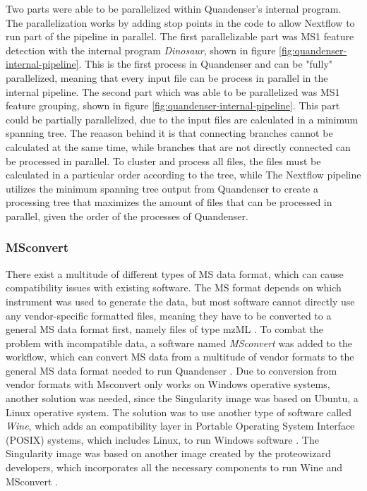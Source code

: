 Two parts were able to be parallelized within Quandenser's internal program. The parallelization works by adding stop points in the code to allow Nextflow to run part of the pipeline in parallel. The first parallelizable part was MS1 feature detection with the internal program \textit{Dinosaur}, shown in figure \ref{fig:quandenser-internal-pipeline}. This is the first process in Quandenser and can be "fully" parallelized, meaning that every input file can be process in parallel in the internal pipeline. The second part which was able to be parallelized was MS1 feature grouping, shown in figure \ref{fig:quandenser-internal-pipeline}. This part could be partially parallelized, due to the input files are calculated in a minimum spanning tree. The reaason behind it is that connecting branches cannot be calculated at the same time, while branches that are not directly connected can be processed in parallel. To cluster and process all files, the files must be calculated in a particular order according to the tree, while The Nextflow pipeline utilizes the minimum spanning tree output from Quandenser to create a processing tree that maximizes the amount of files that can be processed in parallel, given the order of the processes of Quandenser.

\subsubsection{MSconvert}
There exist a multitude of different types of MS data format, which can cause compatibility issues with existing software. The MS format depends on which instrument was used to generate the data, but most software cannot directly use any vendor-specific formatted files, meaning they have to be converted to a general MS data format first, namely files of type mzML \cite{mzml-format}. To combat the problem with incompatible data, a software named \textit{MSconvert} was added to the workflow, which can convert MS data from a multitude of vendor formats to the general MS data format needed to run Quandenser \cite{proteowizard}. Due to conversion from vendor formats with Msconvert only works on Windows operative systems, another solution was needed, since the Singularity image was based on Ubuntu, a Linux operative system. The solution was to use another type of software called \textit{Wine}, which adds an compatibility layer in Portable Operating System Interface (POSIX) systems, which includes Linux, to run Windows software \cite{wine}. The Singularity image was based on another image created by the proteowizard developers, which incorporates all the necessary components to run Wine and MSconvert \cite{docker-image} \cite{docker-howto}.

